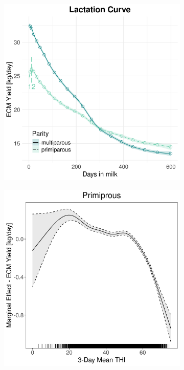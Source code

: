 \begin{figure}[H]
\begin{subfigure}[b]{0.45\textwidth}
        \includegraphics[width=\textwidth]{thesis/figures/models/ecm/before2010/bs_ecm_before2010/bs_ecm_before2010_marginal_dim_milk_combined.png}
    \end{subfigure}
    \begin{subfigure}[b]{0.45\textwidth}
        \centering
        \includegraphics[width=\textwidth]{thesis/figures/models/ecm/before2010/bs_ecm_before2010/bs_ecm_before2010_marginal_thi_milk_primi.png}

\end{subfigure}
\end{figure}
